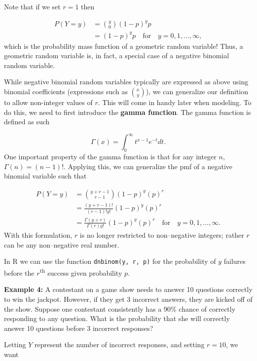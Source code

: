 \documentclass[
]{krantz}
\begin{document}
Note that if we set \(r=1\) then

\begin{align*}
 P(Y=y) &= \binom{y}{0} (1-p)^yp \\
        &= (1-p)^yp \quad \textrm{for} \quad y = 0, 1, \ldots, \infty,
\end{align*}
which is the probability mass function of a geometric random variable! Thus, a geometric random variable is, in fact, a special case of a negative binomial random variable.

While negative binomial random variables typically are expressed as above using binomial coefficients (expressions such as \(\binom{x}{y}\)), we can generalize our definition to allow non-integer values of \(r\). This will come in handy later when modeling. To do this, we need to first introduce the \textbf{gamma function}.  The gamma function is defined as such

\begin{equation}
\Gamma(x)  = \int_0^\infty t^{x-1} e^{-t}dt.
\label{eq:gammaFun}
\end{equation}
One important property of the gamma function is that for any integer \(n\), \(\Gamma(n) = (n-1)!\). Applying this, we can generalize the pmf of a negative binomial variable such that

\begin{align*}
 P(Y=y) &= \binom{y + r - 1}{r-1}           (1-p)^{y}(p)^r \\
        &= \frac{(y+r-1)!}{(r-1)!y!}         (1-p)^{y}(p)^r \\
        &= \frac{\Gamma(y+r)}{\Gamma(r) y!}  (1-p)^{y}(p)^r \quad \textrm{for} \quad y = 0, 1, \ldots, \infty.
\end{align*}
With this formulation, \(r\) is no longer restricted to non--negative integers; rather \(r\) can be any non--negative real number.

In R we can use the function \texttt{dnbinom(y,\ r,\ p)} for the probability of \(y\) failures before the \(r\)\textsuperscript{th} success given probability \(p\).

\textbf{Example 4:} A contestant on a game show needs to answer 10 questions correctly to win the jackpot. However, if they get 3 incorrect answers, they are kicked off of the show. Suppose one contestant consistently has a 90\% chance of correctly responding to any question. What is the probability that she will correctly answer 10 questions before 3 incorrect responses?

Letting \(Y\) represent the number of incorrect responses, and setting \(r = 10\), we want
\end{document}
